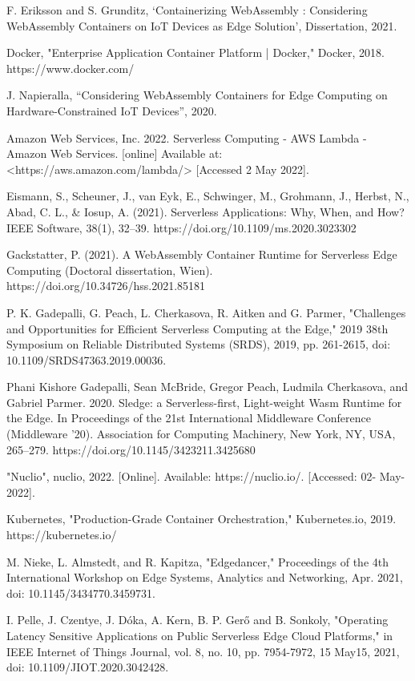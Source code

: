 \begin{thebibliography}{9}
F. Eriksson and S. Grunditz, ‘Containerizing WebAssembly : Considering WebAssembly Containers on IoT Devices as Edge Solution’, Dissertation, 2021.

Docker, "Enterprise Application Container Platform | Docker," Docker, 2018. https://www.docker.com/

J. Napieralla, “Considering WebAssembly Containers for Edge Computing on Hardware-Constrained IoT Devices”, 2020.

Amazon Web Services, Inc. 2022. Serverless Computing - AWS Lambda - Amazon Web Services. [online] Available at: <https://aws.amazon.com/lambda/> [Accessed 2 May 2022].

Eismann, S., Scheuner, J., van Eyk, E., Schwinger, M., Grohmann, J., Herbst, N., Abad, C. L., \& Iosup, A. (2021). Serverless Applications: Why, When, and How? IEEE Software, 38(1), 32–39. https://doi.org/10.1109/ms.2020.3023302

Gackstatter, P. (2021). A WebAssembly Container Runtime for Serverless Edge Computing (Doctoral dissertation, Wien). https://doi.org/10.34726/hss.2021.85181

P. K. Gadepalli, G. Peach, L. Cherkasova, R. Aitken and G. Parmer, "Challenges and Opportunities for Efficient Serverless Computing at the Edge," 2019 38th Symposium on Reliable Distributed Systems (SRDS), 2019, pp. 261-2615, doi: 10.1109/SRDS47363.2019.00036.

Phani Kishore Gadepalli, Sean McBride, Gregor Peach, Ludmila Cherkasova, and Gabriel Parmer. 2020. Sledge: a Serverless-first, Light-weight Wasm Runtime for the Edge. In Proceedings of the 21st International Middleware Conference (Middleware '20). Association for Computing Machinery, New York, NY, USA, 265–279. https://doi.org/10.1145/3423211.3425680

"Nuclio", nuclio, 2022. [Online]. Available: https://nuclio.io/. [Accessed: 02- May- 2022].

Kubernetes, "Production-Grade Container Orchestration," Kubernetes.io, 2019. https://kubernetes.io/

M. Nieke, L. Almstedt, and R. Kapitza, "Edgedancer," Proceedings of the 4th International Workshop on Edge Systems, Analytics and Networking, Apr. 2021, doi: 10.1145/3434770.3459731.

I. Pelle, J. Czentye, J. Dóka, A. Kern, B. P. Gerő and B. Sonkoly, "Operating Latency Sensitive Applications on Public Serverless Edge Cloud Platforms," in IEEE Internet of Things Journal, vol. 8, no. 10, pp. 7954-7972, 15 May15, 2021, doi: 10.1109/JIOT.2020.3042428.


\end{thebibliography}
